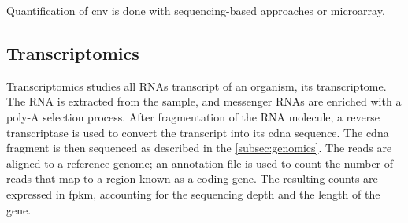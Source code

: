 \documentclass[../main.tex]{subfiles}
\begin{document}
		Quantification of \gls{cnv} is done with sequencing-based approaches or microarray.

	\subsection{Transcriptomics}\label{subsec:transcriptomics}
		Transcriptomics studies all RNAs transcript of an organism, \ie{}its transcriptome.
		The RNA is extracted from the sample, and messenger RNAs are enriched with a poly-A selection process.
		After fragmentation of the RNA molecule, a reverse transcriptase is used to convert the transcript into its \gls{cdna} sequence.
		The \gls{cdna} fragment is then sequenced as described in the \cref{subsec:genomics}.
		The reads are aligned to a reference genome; an annotation file is used to count the number of reads that map to a region known as a coding gene.
		The resulting counts are expressed in \gls{fpkm}, accounting for the sequencing depth and the length of the gene.
\end{document}
